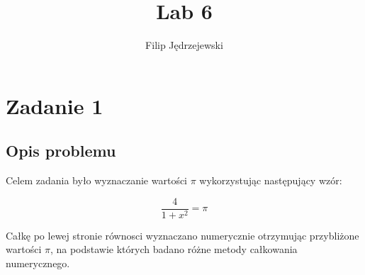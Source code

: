 \documentclass{article}
\title{Lab 6}
\author{Filip Jędrzejewski}
\begin{document}
	
	\section*{Zadanie 1}
	
	\subsection*{Opis problemu}
	
	Celem zadania było wyznaczanie wartości $\pi$ wykorzystując następujący wzór:

	\begin{equation}
		\frac{4}{1 + x^2} = \pi
	\end{equation}

	Całkę po lewej stronie równosci wyznaczano numerycznie otrzymując przybliżone wartości $\pi$, 
	na podstawie których badano różne metody całkowania numerycznego.
	
	
	
	
	
	
	
	
	
	
	
	
	
	
	
	
	
	
	
	
	
	
	
	
\end{document}
